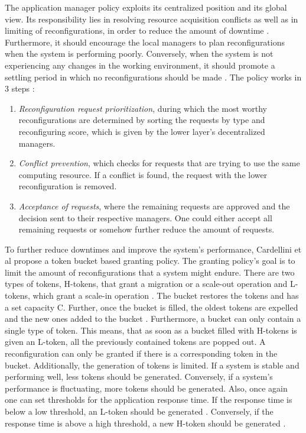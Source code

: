         \quad The application manager policy exploits its centralized position and its global view. 
        Its responsibility lies in resolving resource acquisition conflicts as well as in limiting of reconfigurations, 
        in order to reduce the amount of downtime \cite[p. 179]{cardellini}. Furthermore, it should encourage the local managers to plan reconfigurations when the system 
        is performing poorly. Conversely, when the system is not experiencing any changes in the working environment, it should promote a settling period 
        in which no reconfigurations should be made \cite[p. 179]{cardellini}.
        The policy works in 3 steps \cite[p. 179]{cardellini}:

        \begin{enumerate}
            \item \textit{Reconfiguration request prioritization}, during which the most worthy reconfigurations are determined by sorting the requests 
            by type and reconfiguring score, which is given by the lower layer's decentralized managers. 
            \item \textit{Conflict prevention}, which checks for requests that are trying to use the same computing resource. If a conflict is found, the 
            request with the lower reconfiguration is removed.
            \item \textit{Acceptance of requests}, where the remaining requests are approved and the decision sent to their respective managers. 
            One could either accept all remaining requests or somehow further reduce the amount of requests.
        \end{enumerate}

        To further reduce downtimes and improve the system's performance, Cardellini et al propose a token bucket based granting policy.
        The granting policy's goal is to limit the amount of reconfigurations that a system might endure.
        There are two types of tokens, H-tokens, that grant a migration or a scale-out operation and L-tokens, which grant a scale-in operation \cite{cardellini}.
        The bucket restores the tokens and has a set capacity C. Further, once the bucket is filled, the oldest tokens are expelled and the new ones added to the bucket \cite[p. 179]{cardellini}.
        Furthermore, a bucket can only contain a single type of token. This means, that as soon as a bucket filled with H-tokens is given an L-token, all the previously contained tokens 
        are popped out\cite[p. 179]{cardellini}.
        A reconfiguration can only be granted if there is a corresponding token in the bucket.
        Additionally, the generation of tokens is limited. If a system is stable and performing well, less tokens should be generated. Conversely, if a system's performance 
        is fluctuating, more tokens should be generated.
        Also, once again one can set thresholds for the application response time. If the response time is below a low threshold, an L-token should be generated \cite[p. 179]{cardellini}. 
        Conversely, if the response time is above a high threshold, a new H-token should be generated \cite[p. 179]{cardellini}.


